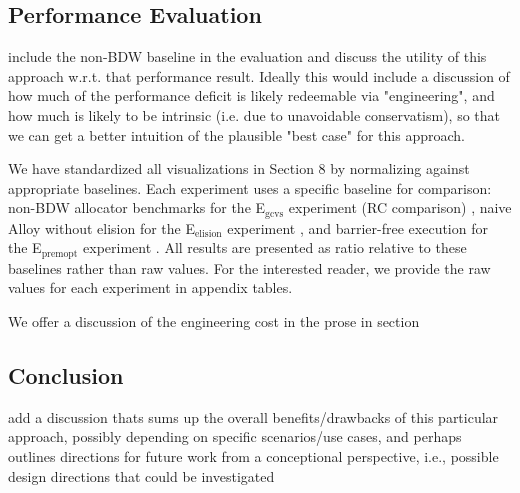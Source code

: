 \documentclass[12pt,a4paper,preprint]{article}
\newcommand\Egcrc{E$_\textrm{gcvs}$\xspace}
\newcommand\Eelision{E$_\textrm{elision}$\xspace}
\newcommand\Epremopt{E$_\textrm{premopt}$\xspace}
\begin{document}
\subsection*{Performance Evaluation}

\begin{blockquote}
include the non-BDW baseline in the evaluation and discuss the utility of this
approach w.r.t. that performance result. Ideally this would include a
discussion of how much of the performance deficit is likely redeemable via
"engineering", and how much is likely to be intrinsic (i.e. due to
unavoidable conservatism), so that we can get a better intuition of the
plausible "best case" for this approach.
\end{blockquote}

We have standardized all visualizations in Section 8 by normalizing against
appropriate baselines. Each experiment uses a specific baseline for comparison:
non-BDW allocator benchmarks for the \Egcrc experiment (RC comparison)
, naive Alloy without elision for the \Eelision
experiment , and barrier-free execution for the
\Epremopt experiment . All results are presented as
ratio relative to these baselines rather than raw values. For the interested
reader, we provide the raw values for each experiment in appendix tables.

We offer a discussion of the engineering cost in the prose in section 

\subsection*{Conclusion}

\begin{blockquote}
add a discussion thats sums up the overall benefits/drawbacks of this
particular approach, possibly depending on specific scenarios/use cases, and
perhaps outlines directions for future work from a conceptional perspective,
i.e., possible design directions that could be investigated
\end{blockquote}
\end{document}
